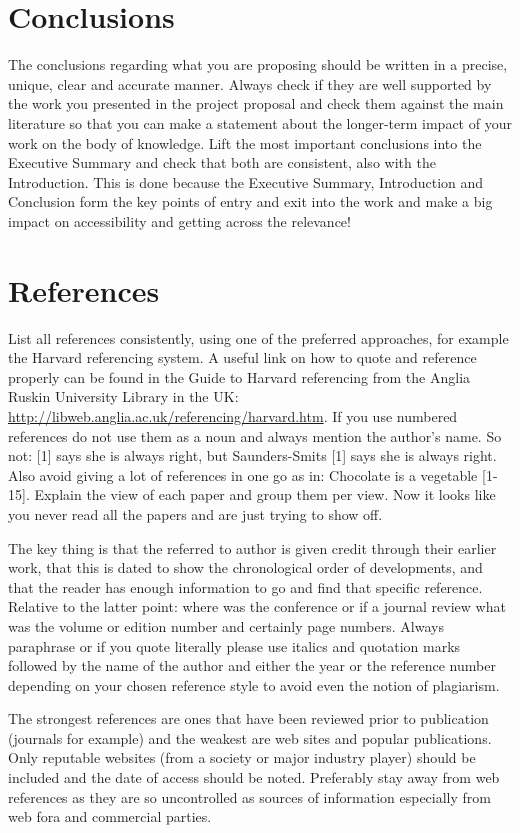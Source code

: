 \documentclass[12pt, english, NoHyper]{AE4010-template}
\begin{document}
\section{Conclusions}
The conclusions regarding what you are proposing should be written in a precise, unique, clear and accurate manner. Always check if they are well supported by the work you presented in the project proposal and check them against the main literature so that you can make a statement about the longer-term impact of your work on the body of knowledge. Lift the most important conclusions into the Executive Summary and check that both are consistent, also with the Introduction. This is done because the Executive Summary, Introduction and Conclusion form the key points of entry and exit into the work and make a big impact on accessibility and getting across the relevance!

\section{References}
List all references consistently, using one of the preferred approaches, for example the Harvard referencing system. A useful link on how to quote and reference properly can be found in the Guide to Harvard referencing from the Anglia Ruskin University Library in the UK: \url{http://libweb.anglia.ac.uk/referencing/harvard.htm}. If you use numbered references do not use them as a noun and always mention the author’s name. So not: [1] says she is always right, but Saunders-Smits [1] says she is always right. Also avoid giving a lot of references in one go as in: Chocolate is a vegetable [1- 15]. Explain the view of each paper and group them per view. Now it looks like you never read all the papers and are just trying to show off.

The key thing is that the referred to author is given credit through their earlier work, that this is dated to show the chronological order of developments, and that the reader has enough information to go and find that specific reference. Relative to the latter point: where was the conference or if a journal review what was the volume or edition number and certainly page numbers. Always paraphrase or if you quote literally please use italics and quotation marks followed by the name of the author and either the year or the reference number depending on your chosen reference style to avoid even the notion of plagiarism.

The strongest references are ones that have been reviewed prior to publication (journals for example) and the weakest are web sites and popular publications. Only reputable websites (from a society or major industry player) should be included and the date of access should be noted. Preferably stay away from web references as they are so uncontrolled as sources of information especially from web fora and commercial parties.
\end{document}
